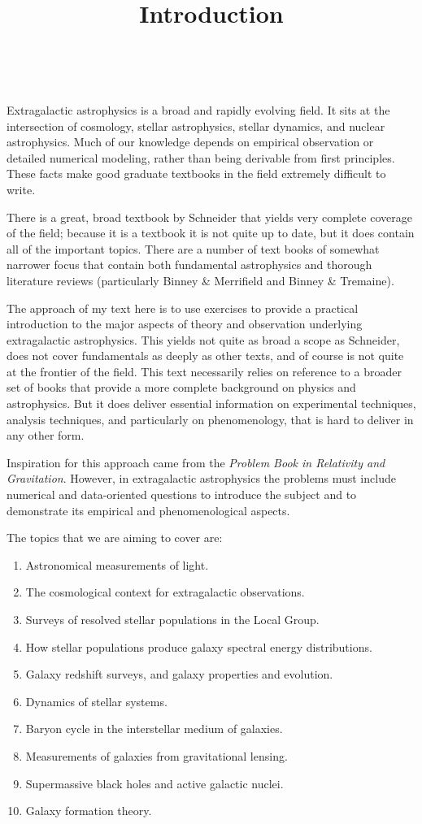 \documentclass[11pt, preprint, maxnames=9]{aastex}
\begin{document}
\title{\bf Introduction}
~

Extragalactic astrophysics is a broad and rapidly evolving field. It
sits at the intersection of cosmology, stellar astrophysics, stellar
dynamics, and nuclear astrophysics. Much of our knowledge depends on
empirical observation or detailed numerical modeling, rather than
being derivable from first principles. These facts make good graduate
textbooks in the field extremely difficult to write. 

There is a great, broad textbook by Schneider that yields very
complete coverage of the field; because it is a textbook it is not
quite up to date, but it does contain all of the important
topics. There are a number of text books of somewhat narrower focus
that contain both fundamental astrophysics and thorough literature
reviews (particularly Binney \& Merrifield and Binney \& Tremaine).

The approach of my text here is to use exercises to provide a
practical introduction to the major aspects of theory and observation
underlying extragalactic astrophysics. This yields not quite as broad
a scope as Schneider, does not cover fundamentals as deeply as other
texts, and of course is not quite at the frontier of the field.  This
text necessarily relies on reference to a broader set of books that
provide a more complete background on physics and astrophysics. But
it does deliver essential information on experimental techniques,
analysis techniques, and particularly on phenomenology, that is hard
to deliver in any other form.

Inspiration for this approach came from the {\it Problem Book in
  Relativity and Gravitation}. However, in extragalactic astrophysics
the problems must include numerical and data-oriented questions to
introduce the subject and to demonstrate its empirical and
phenomenological aspects.

The topics that we are aiming to cover are:
\begin{enumerate}
  \item Astronomical measurements of light.
  \item The cosmological context for extragalactic observations.
  \item Surveys of resolved stellar populations in the Local Group.
  \item How stellar populations produce galaxy spectral energy
    distributions.
  \item Galaxy redshift surveys, and galaxy properties and evolution.
  \item Dynamics of stellar systems.
  \item Baryon cycle in the interstellar medium of galaxies.
  \item Measurements of galaxies from gravitational lensing.
  \item Supermassive black holes and active galactic nuclei.
  \item Galaxy formation theory.
\end{enumerate}
\end{document}
